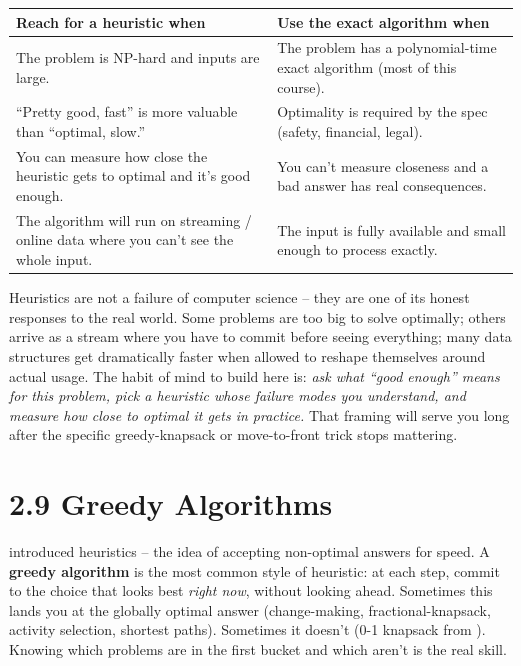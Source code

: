 \documentclass[11pt]{article}
\begin{document}
\begin{center}
\small
\begin{tabular}{p{5.2cm} p{7cm}}
\textbf{Reach for a heuristic when} & \textbf{Use the exact algorithm when} \\
\hline
The problem is NP-hard and inputs are large. & The problem has a
polynomial-time exact algorithm (most of this course). \\
``Pretty good, fast'' is more valuable than ``optimal, slow.'' &
Optimality is required by the spec (safety, financial, legal). \\
You can measure how close the heuristic gets to optimal and it's
good enough. & You can't measure closeness and a bad answer has
real consequences. \\
The algorithm will run on streaming / online data where you can't
see the whole input. & The input is fully available and small
enough to process exactly. \\
\end{tabular}
\normalsize
\end{center}

\begin{ideabox}
Heuristics are not a failure of computer science -- they are one of
its honest responses to the real world. Some problems are too big to
solve optimally; others arrive as a stream where you have to commit
before seeing everything; many data structures get dramatically
faster when allowed to reshape themselves around actual usage. The
habit of mind to build here is: \emph{ask what ``good enough'' means
for this problem, pick a heuristic whose failure modes you
understand, and measure how close to optimal it gets in practice.}
That framing will serve you long after the specific greedy-knapsack
or move-to-front trick stops mattering.
\end{ideabox}

\section{2.9 Greedy Algorithms}

 introduced heuristics -- the idea of accepting
non-optimal answers for speed. A \textbf{greedy algorithm} is the most
common style of heuristic: at each step, commit to the choice that
looks best \emph{right now}, without looking ahead. Sometimes this
lands you at the globally optimal answer (change-making,
fractional-knapsack, activity selection, shortest paths). Sometimes
it doesn't (0-1 knapsack from ). Knowing which
problems are in the first bucket and which aren't is the real skill.
\end{document}
